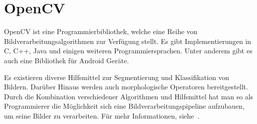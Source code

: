 \section{OpenCV} %
OpenCV ist eine Programmierbibliothek, welche eine Reihe von Bildverarbeitungsalgorithmen zur Verfügung stellt.
Es gibt Implementierungen in C, C++, Java und einigen weiteren Programmiersprachen. Unter anderem gibt es auch eine Bibliothek für Android Geräte.

Es existieren diverse Hilfsmittel zur Segmentierung und Klassifikation von Bildern. Darüber Hinaus werden auch morphologische Operatoren bereitgestellt. Durch die Kombination verschiedener Algorithmen und Hilfsmittel hat man so als Programmierer die Möglichkeit sich eine Bildverarbeitungspipeline aufzubauen, um seine Bilder zu verarbeiten. Für mehr Informationen, siehe~\cite{opencv}.
